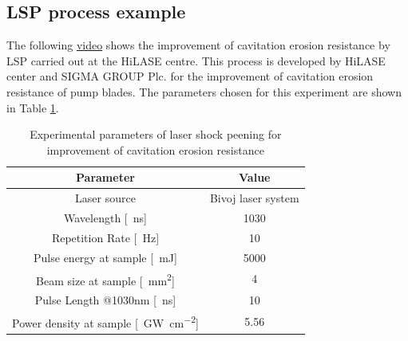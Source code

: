 \subsection{LSP process example}

The following \href{https://www.youtube.com/watch?v=awhlLU91-dk&ab_channel=HiLASECentre}{video} shows the improvement of cavitation erosion resistance by LSP carried out at the HiLASE centre. This process is developed by HiLASE center and SIGMA GROUP Plc. for the improvement of cavitation erosion resistance of pump blades. The parameters chosen for this experiment are shown in Table \ref{experimentalparameters}. 

\begin{table}[h!]
\centering
    \begin{threeparttable}
        \begin{tabular}{|c | c|} 
        \hline
            \textbf{Parameter} & \textbf{Value} \\ [0.5ex] 
        \hline
        Laser source & Bivoj laser system  \\
        \hline
        Wavelength [\SI{}{\nano\second}] & 1030 \\
        \hline
        Repetition Rate [\SI{}{\hertz}] & 10  \\ 
        \hline
            Pulse energy at sample [\SI{}{\milli\joule}] & 5000 \\
        \hline
            Beam size at sample [\SI{}{\mm\squared}] & 4 \\
        \hline
            Pulse Length @1030nm [\SI{}{\nano\second}] & 10 \\
        \hline
            Power density at sample [\SI{}{\giga\watt\per\cm\squared}] & 5.56 \\

        \hline
        \end{tabular}

        \caption{Experimental parameters of laser shock peening for improvement of cavitation erosion resistance}
        \label{experimentalparameters}
    \end{threeparttable}
\end{table}


